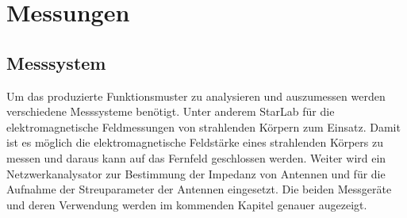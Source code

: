 \newpage
\chapter{Messungen}
\label{sec:Messung}
\section{Messsystem}
Um das produzierte Funktionsmuster zu analysieren und auszumessen werden verschiedene Messsysteme benötigt. Unter anderem StarLab für die elektromagnetische Feldmessungen von strahlenden Körpern zum Einsatz.  Damit ist es möglich die elektromagnetische Feldstärke eines strahlenden Körpers zu messen und daraus kann auf das Fernfeld geschlossen werden. Weiter wird ein Netzwerkanalysator zur Bestimmung der Impedanz von Antennen und für die Aufnahme der Streuparameter der Antennen eingesetzt. Die beiden Messgeräte und deren Verwendung werden im kommenden Kapitel genauer augezeigt.\\

